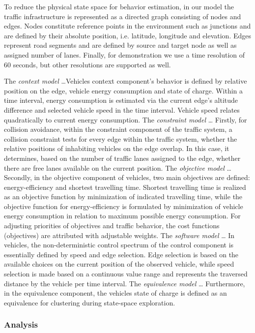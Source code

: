 \documentclass[conference]{../cls/IEEEtran}
\begin{document}
To reduce the physical state space for behavior estimation, in our model the
traffic infrastructure is represented as a directed graph consisting of nodes and edges. Nodes constitute reference points in the environment such as junctions and are defined by their absolute position, i.e.
latitude, longitude and elevation. Edges represent road segments and are defined
by source and target node as well as assigned number of
lanes.
Finally, for demonstration we use a time resolution of 60 seconds, but other
resolutions are supported as well.

The \textit{context model} \ldots Vehicles
context component's behavior is defined by relative position on the edge, vehicle energy
consumption and state of charge. Within a time interval, energy consumption
is estimated via the current edge's altitude difference and selected
vehicle speed in the time interval. Vehicle speed relates quadratically to
current energy consumption. 
The \textit{constraint model} \ldots
Firstly, for collision avoidance, within the constraint
component of the traffic system, a collision constraint tests for every
edge within the traffic system, whether the relative positions of inhabiting
vehicles on the edge overlap. In this case, it determines, based on the number of traffic
lanes assigned to the edge, whether there are free lanes available on the
current position.
The \textit{objective model} \ldots
Secondly, in the objective component of vehicles, two main
objectives are defined: energy-efficiency and shortest travelling time.
Shortest travelling time is realized as
an objective function by minimization of indicated travelling time, while the
objective function for energy-efficiency is formulated by minimization of vehicle
energy consumption in relation to maximum possible energy consumption.
For adjusting priorities of objectives and traffic
behavior, the cost functions (objectives) are attributed with adjustable
weights.
The \textit{software model} \ldots
In vehicles, the non-deterministic control spectrum of the control
component is essentially defined by speed and edge selection.
Edge selection is based on the available choices on the current position of the observed
vehicle, while speed selection is made based on a continuous value range and
represents the traversed distance by the vehicle per time interval.
The \textit{equivalence model} \ldots 
Furthermore, in the equivalence component, the
vehicles state of charge is defined as an equivalence for clustering during state-space exploration.

\subsubsection{Analysis}
\end{document}
